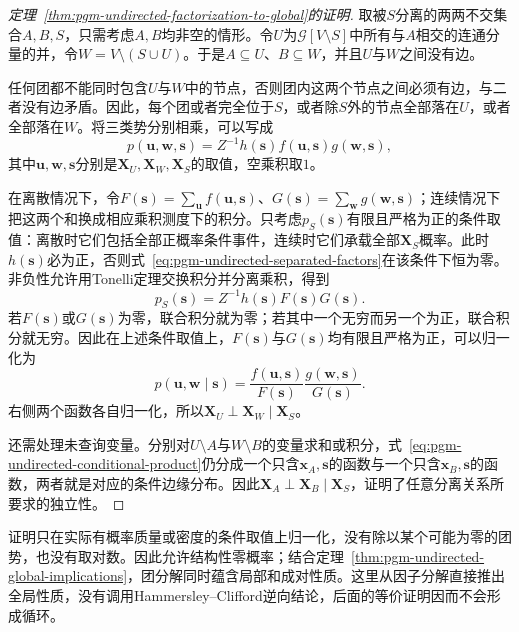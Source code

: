 \begin{proof}[定理~\ref{thm:pgm-undirected-factorization-to-global}的证明]
取被$S$分离的两两不交集合$A,B,S$，只需考虑$A,B$均非空的情形。令$U$为$\mathcal{G}[V\setminus S]$中所有与$A$相交的连通分量的并，令$W=V\setminus(S\cup U)$。于是$A\subseteq U$、$B\subseteq W$，并且$U$与$W$之间没有边。

任何团都不能同时包含$U$与$W$中的节点，否则团内这两个节点之间必须有边，与二者没有边矛盾。因此，每个团或者完全位于$S$，或者除$S$外的节点全部落在$U$，或者全部落在$W$。将三类势分别相乘，可以写成
\begin{equation}
  p(\bm{u},\bm{w},\bm{s})
  =Z^{-1}h(\bm{s})f(\bm{u},\bm{s})g(\bm{w},\bm{s}),
  \label{eq:pgm-undirected-separated-factors}
\end{equation}
其中$\bm{u},\bm{w},\bm{s}$分别是$\bm{X}_U,\bm{X}_W,\bm{X}_S$的取值，空乘积取$1$。

在离散情况下，令$F(\bm{s})=\sum_{\bm{u}}f(\bm{u},\bm{s})$、$G(\bm{s})=\sum_{\bm{w}}g(\bm{w},\bm{s})$；连续情况下把这两个和换成相应乘积测度下的积分。只考虑$p_S(\bm{s})$有限且严格为正的条件取值：离散时它们包括全部正概率条件事件，连续时它们承载全部$\bm{X}_S$概率。此时$h(\bm{s})$必为正，否则式~\eqref{eq:pgm-undirected-separated-factors}在该条件下恒为零。非负性允许用Tonelli定理交换积分并分离乘积，得到
\[
  p_S(\bm{s})=Z^{-1}h(\bm{s})F(\bm{s})G(\bm{s}).
\]
若$F(\bm{s})$或$G(\bm{s})$为零，联合积分就为零；若其中一个无穷而另一个为正，联合积分就无穷。因此在上述条件取值上，$F(\bm{s})$与$G(\bm{s})$均有限且严格为正，可以归一化为
\begin{equation}
  p(\bm{u},\bm{w}\mid\bm{s})
  =\frac{f(\bm{u},\bm{s})}{F(\bm{s})}
   \frac{g(\bm{w},\bm{s})}{G(\bm{s})}.
  \label{eq:pgm-undirected-conditional-product}
\end{equation}
右侧两个函数各自归一化，所以$\bm{X}_U\perp\bm{X}_W\mid\bm{X}_S$。

还需处理未查询变量。分别对$U\setminus A$与$W\setminus B$的变量求和或积分，式~\eqref{eq:pgm-undirected-conditional-product}仍分成一个只含$\bm{x}_A,\bm{s}$的函数与一个只含$\bm{x}_B,\bm{s}$的函数，两者就是对应的条件边缘分布。因此$\bm{X}_A\perp\bm{X}_B\mid\bm{X}_S$，证明了任意分离关系所要求的独立性。
\end{proof}

证明只在实际有概率质量或密度的条件取值上归一化，没有除以某个可能为零的团势，也没有取对数。因此允许结构性零概率；结合定理~\ref{thm:pgm-undirected-global-implications}，团分解同时蕴含局部和成对性质。这里从因子分解直接推出全局性质，没有调用Hammersley--Clifford逆向结论，后面的等价证明因而不会形成循环。

